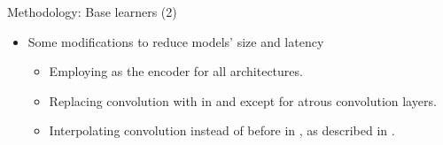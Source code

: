 \documentclass{cubeamer}
\begin{document}
\begin{frame}{Methodology: Base learners (2)}
    \begin{itemize}
    \item Some modifications to reduce models' size and latency
        \begin{itemize}
            \item Employing  \cite{ghostnet} as the encoder for all architectures.
            \item Replacing convolution with  in \cite{adabins} and \cite{bts} except for atrous convolution layers.
            \item Interpolating  convolution instead of before in \cite{adabins}, as described in \cite{fastdepth}.
        \end{itemize}
    \end{itemize}
    

\end{frame}
\end{document}
